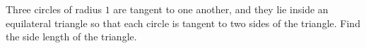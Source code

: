 Three circles of radius $1$ are tangent to one another, and they lie inside an equilateral triangle so that each circle is tangent to two sides of the triangle. Find the side length of the triangle.
